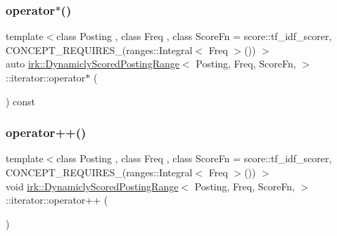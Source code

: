 \mbox{\label{classirk_1_1DynamiclyScoredPostingRange_1_1iterator_a96682059e84244fa99b31104ad294835}} 
\subsubsection{\texorpdfstring{operator$\ast$()}{operator*()}}
{\footnotesize\ttfamily template$<$class Posting , class Freq , class Score\+Fn  = score\+::tf\+\_\+idf\+\_\+scorer, C\+O\+N\+C\+E\+P\+T\+\_\+\+R\+E\+Q\+U\+I\+R\+E\+S\+\_\+(ranges\+::\+Integral$<$ Freq $>$()) $>$ \\
auto \mbox{\hyperlink{classirk_1_1DynamiclyScoredPostingRange}{irk\+::\+Dynamicly\+Scored\+Posting\+Range}}$<$ Posting, Freq, Score\+Fn, $>$\+::iterator\+::operator$\ast$ (\begin{DoxyParamCaption}{ }\end{DoxyParamCaption}) const\hspace{0.3cm}{\ttfamily [inline]}}

\mbox{\label{classirk_1_1DynamiclyScoredPostingRange_1_1iterator_a96516b3e741b08e209ac906b371bb532}} 
\subsubsection{\texorpdfstring{operator++()}{operator++()}\hspace{0.1cm}{\footnotesize\ttfamily [1/2]}}
{\footnotesize\ttfamily template$<$class Posting , class Freq , class Score\+Fn  = score\+::tf\+\_\+idf\+\_\+scorer, C\+O\+N\+C\+E\+P\+T\+\_\+\+R\+E\+Q\+U\+I\+R\+E\+S\+\_\+(ranges\+::\+Integral$<$ Freq $>$()) $>$ \\
void \mbox{\hyperlink{classirk_1_1DynamiclyScoredPostingRange}{irk\+::\+Dynamicly\+Scored\+Posting\+Range}}$<$ Posting, Freq, Score\+Fn, $>$\+::iterator\+::operator++ (\begin{DoxyParamCaption}{ }\end{DoxyParamCaption})\hspace{0.3cm}{\ttfamily [inline]}}

